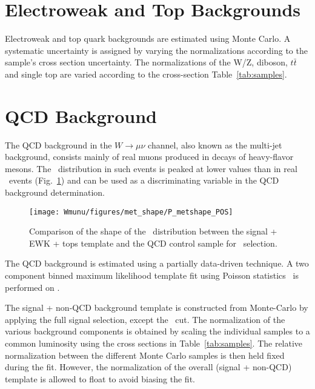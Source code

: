 
\section{Electroweak and Top Backgrounds}
\label{sec:Wmunu:EWKbackground}
Electroweak and top quark backgrounds are estimated using Monte Carlo. A systematic uncertainty is assigned by varying the normalizations according to the sample's cross section uncertainty. The normalizations of the W/Z, diboson, $t\bar{t}$ and single top are varied according to the cross-section Table~\ref{tab:samples}.

\section{QCD Background}
\label{sec:wmnu:qcdbkg}

The QCD background in the $W \rightarrow \mu \nu$ channel, also known as the multi-jet background, consists mainly of real muons produced in decays of heavy-flavor mesons.
The \MET\ distribution in such events is peaked at lower values than in real \Wmn\ events (Fig.~\ref{fig:Wmunu:qcd_met_shape_ewk}) and can be used as a discriminating variable in the QCD background determination.

\begin{figure}[phtb]
  \begin{center}
    \texttt{[image: Wmunu/figures/met\_shape/P\_metshape\_POS]}
    \caption{Comparison of the shape of the \MET\ distribution between the signal + EWK + tops template and the QCD control sample for \Wmunup\ selection.}
    \label{fig:Wmunu:qcd_met_shape_ewk}
  \end{center}
\end{figure}

The QCD background is estimated using a partially data-driven technique. A two component binned maximum likelihood template fit using
Poisson statistics~\cite{Barlow:1993dm} is performed on \MET.

The signal + non-QCD background template is constructed from Monte-Carlo by applying the full signal selection, except the \MET\ cut. The
normalization of the various background components is obtained by
scaling the individual samples to a common luminosity using the cross
sections in Table~\ref{tab:samples}.
The relative normalization between the different Monte Carlo samples is then held fixed during the fit.
However, the normalization of the overall (signal + non-QCD) template is allowed to float to avoid biasing
the fit.

